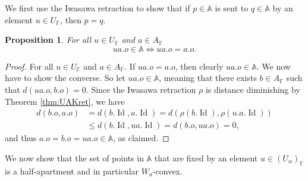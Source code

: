 \documentclass[12pt]{amsart}
\newcommand{\F}{\mathbb{F} }
\newcommand{\A}{\mathbb{A}}
\numberwithin{equation}{section}
\newtheorem{proposition}[theorem]{Proposition}
\theoremstyle{remark} %
\begin{document}
We first use the Iwasawa retraction to show that if $p \in \A$ is sent to $q \in \A$ by an element $u \in U_\F$, then $p=q$.

\begin{proposition} \label{prop:UonA}
	For all $u\in U_\F$ and $a \in A_\F$
	$$
	ua.o \in \mathbb{A} \iff ua.o = a.o. 
	$$
\end{proposition}
\begin{proof}
	For all $u \in U_\F$ and $a \in A_\F$. If $ua.o = a.o$, then clearly $ua.o \in \mathbb{A}$. We now have to show the converse. So let $ua.o\in \mathbb{A}$, meaning that there exists $b\in  A_\F$ such that $d(ua.o , b.o) =0$. Since the Iwasawa retraction $\rho$ is distance diminishing by Theorem \ref{thm:UAKret}, we have
	\begin{align*}
		d(b.o, a.o) &= d(b.\operatorname{Id},a.\operatorname{Id}) = d(\rho(b.\operatorname{Id}),\rho(u.a.\operatorname{Id})) \\
		&\leq d(b.\operatorname{Id},ua.\operatorname{Id}) = d(b.o, ua.o) = 0,
	\end{align*}
	and thus $a.o = b.o = ua.o \in \A$, as claimed.
\end{proof}
We now show that the set of points in $\A$ that are fixed by an element $u\in (U_\alpha)_\F$ is a half-apartment and in particular $W_a$-convex.
\end{document}
